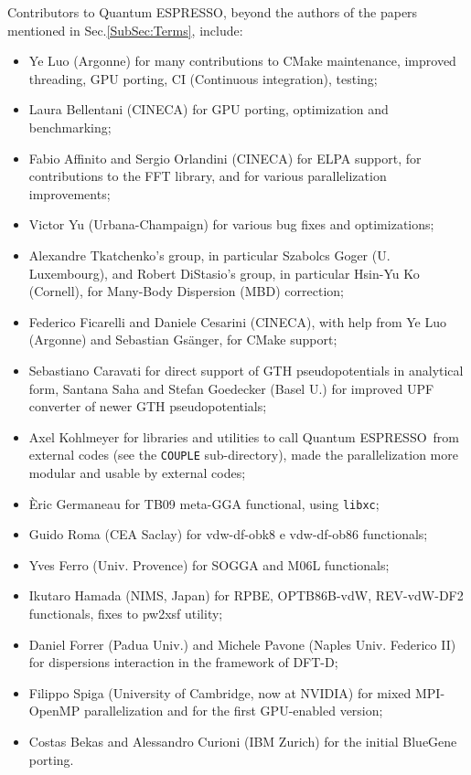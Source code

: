 \documentclass[12pt,a4paper]{article}
\def\qe{{\sc Quantum ESPRESSO}}
\def\libxc{\texttt{libxc}}
\begin{document}
Contributors to \qe, beyond the authors of the papers
mentioned in Sec.\ref{SubSec:Terms}, include:
\begin{itemize}
  \item Ye Luo (Argonne) for many contributions to CMake maintenance,
  improved threading, GPU porting, CI (Continuous integration), testing;
  \item Laura Bellentani (CINECA) for GPU porting, optimization 
  and benchmarking;
  \item Fabio Affinito and Sergio Orlandini (CINECA) for ELPA support, 
  for contributions to the FFT library, and for various parallelization
  improvements;
  \item Victor Yu (Urbana-Champaign) for various bug fixes and
	optimizations;
  \item Alexandre Tkatchenko's group, in particular Szabolcs Goger
  (U. Luxembourg), and Robert DiStasio's group, in particular
  Hsin-Yu Ko (Cornell), for Many-Body Dispersion (MBD) correction;
  \item Federico Ficarelli and Daniele Cesarini (CINECA), with help
  from Ye Luo (Argonne) and Sebastian Gs\"anger, for CMake support;
  \item Sebastiano Caravati for direct support of GTH pseudopotentials
  in analytical form, Santana Saha and Stefan Goedecker (Basel U.)
  for improved UPF converter of newer GTH pseudopotentials;
  \item Axel Kohlmeyer for libraries and utilities to call \qe\
  from external codes (see the \texttt{COUPLE} sub-directory), made the
  parallelization more modular and usable by external codes;
  \item \`Eric Germaneau for TB09 meta-GGA functional, using \libxc;
  \item Guido Roma (CEA Saclay) for  vdw-df-obk8  e vdw-df-ob86 functionals;
  \item Yves Ferro (Univ. Provence) for SOGGA and M06L functionals;
  \item Ikutaro Hamada (NIMS, Japan) for RPBE, OPTB86B-vdW, REV-vdW-DF2
	  functionals, fixes to pw2xsf utility;
  \item Daniel Forrer (Padua Univ.) and Michele Pavone
        (Naples Univ. Federico II) for dispersions interaction in the
        framework of DFT-D;
\item Filippo Spiga (University of Cambridge, now at NVIDIA)
  for mixed MPI-OpenMP parallelization and for the first
  GPU-enabled version;
  \item Costas Bekas and Alessandro Curioni (IBM Zurich) for the initial
  BlueGene porting.
\end{itemize}
\end{document}
